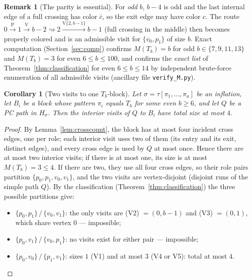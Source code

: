 \documentclass[11pt]{article}
\newtheorem{corollary}[theorem]{Corollary}
\theoremstyle{definition}
\newtheorem{remark}[theorem]{Remark}
\begin{document}
\begin{remark}[The parity is essential]\label{rem:parity}
For \emph{odd} $b$, $b - 4$ is odd and the last internal edge of a full crossing has
color $\bar c$, so the exit edge may have color $c$. The route
$0 \xrightarrow{\mathrm P} 1 \xrightarrow{\mathrm V} b-2 \rightsquigarrow 2
\xrightarrow{\mathrm V\{2,b-1\}} b-1$ (full crossing in the middle) then becomes
properly colored and is an admissible visit for $\{v_0, p_1\}$ of size $b$. Exact
computation (Section~\ref{sec:comp}) confirms $M(T_b) = b$ for odd
$b \in \{7, 9, 11, 13\}$ and $M(T_b) = 3$ for even $6 \le b \le 100$, and confirms
the \emph{exact list} of Theorem~\ref{thm:classification} for even
$6 \le b \le 14$ by independent brute-force enumeration of all admissible visits
(ancillary file \texttt{verify\_M.py}).
\end{remark}

\begin{corollary}[Two visits to one $T_b$-block]\label{cor:pairs}
Let $\sigma = \tau[\pi_1, \dots, \pi_a]$ be an inflation, let $B_i$ be a block whose
pattern $\pi_i$ equals $T_b$ for some even $b \ge 6$, and let $Q$ be a PC path in
$H_\sigma$. Then the interior visits of $Q$ to $B_i$ have total size at most $4$.
\end{corollary}

\begin{proof}
By Lemma~\ref{lem:crosscount}, the block has at most four incident cross edges, one
per role; each interior visit uses two of them (its entry and its exit, distinct
edges), and every cross edge is used by $Q$ at most once. Hence there are at most two
interior visits; if there is at most one, its size is at most $M(T_b) = 3 \le 4$. If
there are two, they use all four cross edges, so their role pairs partition
$\{p_0, p_1, v_0, v_1\}$, and the two visits are vertex-disjoint (disjoint runs of
the simple path $Q$). By the classification
(Theorem~\ref{thm:classification}) the three possible partitions give:
\begin{itemize}
\item $\{p_0, p_1\} \,/\, \{v_0, v_1\}$: the only visits are (V2) $= (0, b-1)$ and
(V3) $= (0,1)$, which share vertex $0$ --- impossible;
\item $\{p_0, v_1\} \,/\, \{v_0, p_1\}$: no visits exist for either pair ---
impossible;
\item $\{p_0, v_0\} \,/\, \{p_1, v_1\}$: sizes $1$ (V1) and at most $3$ (V4 or V5):
total at most $4$.
\end{itemize}
\end{proof}
\end{document}
